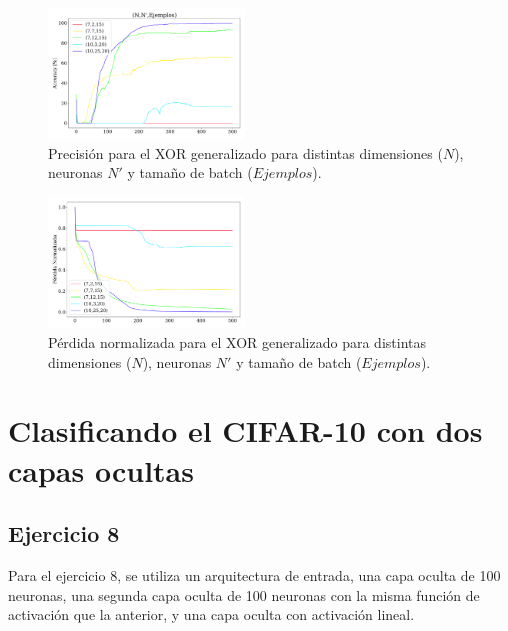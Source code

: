 \begin{figure}[H]
    \begin{small}
        \begin{center}
            \includegraphics[width=0.465\textwidth]{Graphs/ejer7_acc.pdf}
        \end{center}
        \caption{Precisión para el XOR generalizado para distintas dimensiones ($N$), neuronas $N'$ y tamaño de batch ($Ejemplos$).}
        \label{fig:ejer7_acc}
    \end{small}
\end{figure}


\begin{figure}[H]
    \begin{small}
        \begin{center}
            \includegraphics[width=0.465\textwidth]{Graphs/ejer7_loss.pdf}
        \end{center}
        \caption{Pérdida normalizada para el XOR generalizado para distintas dimensiones ($N$), neuronas $N'$ y tamaño de batch ($Ejemplos$).}
        \label{fig:ejer7_loss}
    \end{small}
\end{figure}

\section*{Clasificando el CIFAR-10 con dos capas ocultas}

\subsection*{Ejercicio 8}
Para el ejercicio 8, se utiliza un arquitectura de entrada, una capa oculta de 100 neuronas, una segunda capa oculta de 100 neuronas con la misma función de activación que la anterior, y una capa oculta con activación lineal. 

